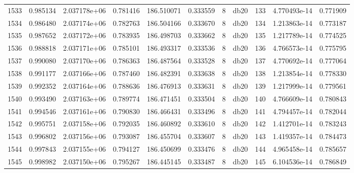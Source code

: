 \begin{tabular}{lrrrrrrlrrr}
1533 &    0.985134 &        2.037178e+06 &  0.781416 &              186.510071 &    0.333559 &       8 &         db20 &    133 &   4.770493e-14 &      0.771909 \\
1534 &    0.986480 &        2.037174e+06 &  0.782763 &              186.504166 &    0.333670 &       8 &         db20 &    134 &   1.213863e-14 &      0.773187 \\
1535 &    0.987652 &        2.037172e+06 &  0.783935 &              186.498703 &    0.333662 &       8 &         db20 &    135 &   1.217789e-14 &      0.774525 \\
1536 &    0.988818 &        2.037171e+06 &  0.785101 &              186.493317 &    0.333536 &       8 &         db20 &    136 &   4.766573e-14 &      0.775795 \\
1537 &    0.990080 &        2.037170e+06 &  0.786363 &              186.487564 &    0.333528 &       8 &         db20 &    137 &   4.770692e-14 &      0.777064 \\
1538 &    0.991177 &        2.037166e+06 &  0.787460 &              186.482391 &    0.333638 &       8 &         db20 &    138 &   1.213854e-14 &      0.778330 \\
1539 &    0.992352 &        2.037164e+06 &  0.788636 &              186.476913 &    0.333631 &       8 &         db20 &    139 &   1.217999e-14 &      0.779561 \\
1540 &    0.993490 &        2.037163e+06 &  0.789774 &              186.471451 &    0.333504 &       8 &         db20 &    140 &   4.766609e-14 &      0.780843 \\
1541 &    0.994546 &        2.037161e+06 &  0.790830 &              186.466431 &    0.333496 &       8 &         db20 &    141 &   4.794457e-14 &      0.782044 \\
1542 &    0.995751 &        2.037158e+06 &  0.792035 &              186.460892 &    0.333610 &       8 &         db20 &    142 &   1.412701e-14 &      0.783243 \\
1543 &    0.996802 &        2.037156e+06 &  0.793087 &              186.455704 &    0.333607 &       8 &         db20 &    143 &   1.419357e-14 &      0.784473 \\
1544 &    0.997843 &        2.037155e+06 &  0.794127 &              186.450699 &    0.333476 &       8 &         db20 &    144 &   4.965458e-14 &      0.785657 \\
1545 &    0.998982 &        2.037150e+06 &  0.795267 &              186.445145 &    0.333487 &       8 &         db20 &    145 &   6.104536e-14 &      0.786849 \\

\end{tabular}
